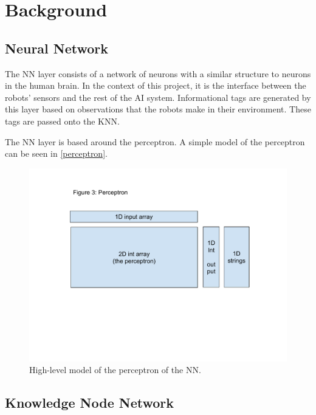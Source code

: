 \documentclass[titlepage,11pt]{article}
\newcommand{\ar}[1]{\autoref{#1}}
\begin{document}
\section{Background} \label{sec:background}

\subsection{Neural Network}

The NN layer consists of a network of neurons with a similar structure to neurons in the human brain. In the context of this project, it is the interface between the robots' sensors and the rest of the AI system. Informational tags are generated by this layer based on observations that the robots make in their environment. These tags are passed onto the KNN.

The NN layer is based around the perceptron. A simple model of the perceptron can be seen in \ar{perceptron}.

\begin{figure}[!htb]
	\includegraphics[width=\columnwidth]{figures/perceptron.pdf}
	\caption{High-level model of the perceptron of the NN. \cite{vybihal-perceptron}}
	\label{perceptron}
\end{figure}

\subsection{Knowledge Node Network}
\end{document}
